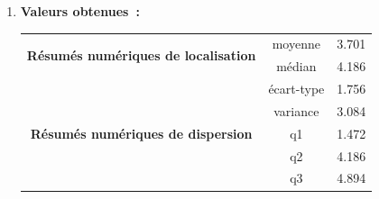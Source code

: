 \begin{enumerate}
        \clearpage

    \item \textbf{Valeurs obtenues~:}
    
        \vspace{.2cm}

        \begin{center}
            \begin{tabular}{| c |  c | c |}
                \hline
                \multirow{ 2}{*}{\textbf{Résumés numériques de localisation}} & moyenne & 3.701 \\ \cline{2-3}
                                                                    & médian  & 4.186 \\ \hline
                \multirow{ 5}{*}{\textbf{Résumés numériques de dispersion}}   & écart-type & 1.756 \\ \cline{2-3}
                                                                    & variance  & 3.084 \\ \cline{2-3}
                                                                    & q1  & 1.472 \\ \cline{2-3}
                                                                    & q2  & 4.186 \\ \cline{2-3}
                                                                    & q3  & 4.894 \\ \hline
            \end{tabular}
        \end{center}

        \vspace{.5cm}


\end{enumerate}
